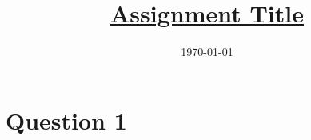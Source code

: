\documentclass[a4paper, 11pt]{article}
\title{\vspace{-1.25cm} \underline{Assignment Title}}
\author{}
\date{\vspace{-1.25cm}\today}
\theoremstyle{plain}
\theoremstyle{definition}
\begin{document}
\maketitle

\section*{Question 1}




\appendix


\end{document}
